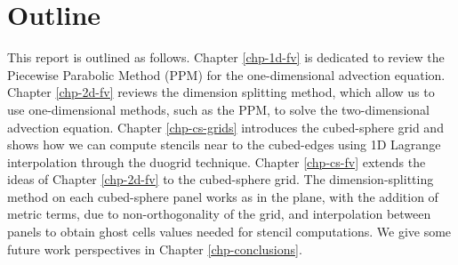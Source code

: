 \section{Outline}
This report is outlined as follows.
Chapter \ref{chp-1d-fv} is dedicated to review the Piecewise Parabolic Method (PPM)
for the one-dimensional advection equation. 
Chapter \ref{chp-2d-fv} reviews the dimension splitting method, which allow us to use 
one-dimensional methods, such as the PPM, to solve the two-dimensional advection equation.
Chapter \ref{chp-cs-grids} introduces the cubed-sphere grid and shows how we can compute stencils
near to the cubed-edges using 1D Lagrange interpolation through the duogrid technique.
Chapter \ref{chp-cs-fv} extends the ideas of Chapter \ref{chp-2d-fv} to the cubed-sphere grid.
The dimension-splitting method on each cubed-sphere panel works as in the plane, with the addition
of metric terms, due to non-orthogonality of the grid, and interpolation between panels
to obtain ghost cells values needed for stencil computations.
We give some future work perspectives in Chapter \ref{chp-conclusions}.
